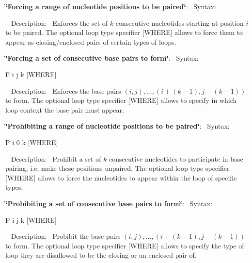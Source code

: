 \begin{DoxyEnumerate}
\item {\bfseries{\char`\"{}\+Forcing a range of nucleotide positions to be paired\char`\"{}}}\+:~\newline
 Syntax\+:
\begin{DoxyCode}{0}
\end{DoxyCode}
~\newline
 Description\+:~\newline
 Enforces the set of $ k $ consecutive nucleotides starting at position $ i $ to be paired. The optional loop type specifier {\ttfamily }\mbox{[}W\+H\+E\+RE\mbox{]} allows to force them to appear as closing/enclosed pairs of certain types of loops.
\item {\bfseries{\char`\"{}\+Forcing a set of consecutive base pairs to form\char`\"{}}}\+:~\newline
 Syntax\+:\begin{DoxyVerb}F i j k [WHERE] \end{DoxyVerb}
~\newline
 Description\+:~\newline
 Enforces the base pairs $ (i,j), \ldots, (i+(k-1), j-(k-1)) $ to form. The optional loop type specifier {\ttfamily }\mbox{[}W\+H\+E\+RE\mbox{]} allows to specify in which loop context the base pair must appear.
\item {\bfseries{\char`\"{}\+Prohibiting a range of nucleotide positions to be paired\char`\"{}}}\+:~\newline
 Syntax\+:\begin{DoxyVerb}P i 0 k [WHERE] \end{DoxyVerb}
~\newline
 Description\+:~\newline
 Prohibit a set of $ k $ consecutive nucleotides to participate in base pairing, i.\+e. make these positions unpaired. The optional loop type specifier {\ttfamily }\mbox{[}W\+H\+E\+RE\mbox{]} allows to force the nucleotides to appear within the loop of specific types.
\item {\bfseries{\char`\"{}\+Probibiting a set of consecutive base pairs to form\char`\"{}}}\+:~\newline
 Syntax\+:\begin{DoxyVerb}P i j k [WHERE] \end{DoxyVerb}
~\newline
 Description\+:~\newline
 Probibit the base pairs $ (i,j), \ldots, (i+(k-1), j-(k-1)) $ to form. The optional loop type specifier {\ttfamily }\mbox{[}W\+H\+E\+RE\mbox{]} allows to specify the type of loop they are disallowed to be the closing or an enclosed pair of.

\end{DoxyEnumerate}
